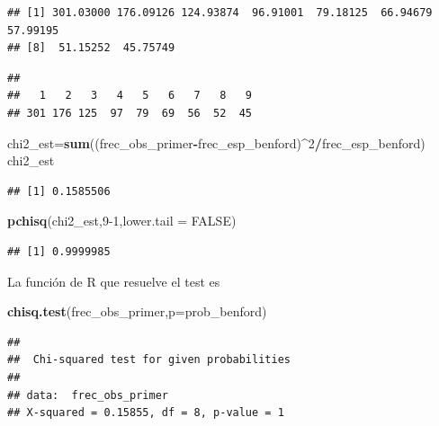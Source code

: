 \documentclass[
]{article}
\newenvironment{Shaded}{\begin{snugshade}}{\end{snugshade}}
\newcommand{\DataTypeTok}[1]{\textcolor[rgb]{0.13,0.29,0.53}{#1}}
\newcommand{\DecValTok}[1]{\textcolor[rgb]{0.00,0.00,0.81}{#1}}
\newcommand{\KeywordTok}[1]{\textcolor[rgb]{0.13,0.29,0.53}{\textbf{#1}}}
\newcommand{\NormalTok}[1]{#1}
\newcommand{\OperatorTok}[1]{\textcolor[rgb]{0.81,0.36,0.00}{\textbf{#1}}}
\newcommand{\OtherTok}[1]{\textcolor[rgb]{0.56,0.35,0.01}{#1}}
\begin{document}
\begin{verbatim}
## [1] 301.03000 176.09126 124.93874  96.91001  79.18125  66.94679  57.99195
## [8]  51.15252  45.75749
\end{verbatim}

\begin{Shaded}
\end{Shaded}

\begin{verbatim}
## 
##   1   2   3   4   5   6   7   8   9 
## 301 176 125  97  79  69  56  52  45
\end{verbatim}

\begin{Shaded}
\begin{Highlighting}[]
\NormalTok{chi2\_est=}\KeywordTok{sum}\NormalTok{((frec\_obs\_primer}\OperatorTok{{-}}\NormalTok{frec\_esp\_benford)}\OperatorTok{\^{}}\DecValTok{2}\OperatorTok{/}\NormalTok{frec\_esp\_benford)}
\NormalTok{chi2\_est}
\end{Highlighting}
\end{Shaded}

\begin{verbatim}
## [1] 0.1585506
\end{verbatim}

\begin{Shaded}
\begin{Highlighting}[]
\KeywordTok{pchisq}\NormalTok{(chi2\_est,}\DecValTok{9{-}1}\NormalTok{,}\DataTypeTok{lower.tail =} \OtherTok{FALSE}\NormalTok{)}
\end{Highlighting}
\end{Shaded}

\begin{verbatim}
## [1] 0.9999985
\end{verbatim}

La función de R que resuelve el test es

\begin{Shaded}
\begin{Highlighting}[]
\KeywordTok{chisq.test}\NormalTok{(frec\_obs\_primer,}\DataTypeTok{p=}\NormalTok{prob\_benford)}
\end{Highlighting}
\end{Shaded}

\begin{verbatim}
## 
##  Chi-squared test for given probabilities
## 
## data:  frec_obs_primer
## X-squared = 0.15855, df = 8, p-value = 1
\end{verbatim}
\end{document}
